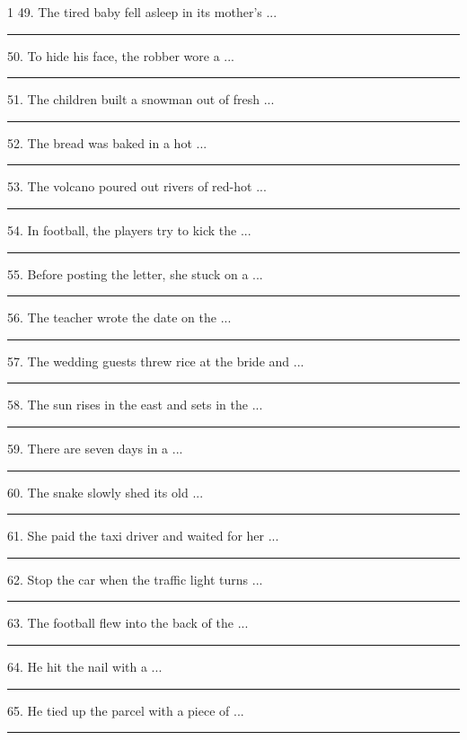 \documentclass[11pt,a4paper]{article}
\newcommand{\blank}[1][1.2cm]{\rule{#1}{0.4pt}}
\begin{document}
\begin{multicols}{1}
49. The tired baby fell asleep in its mother's ...\hfill\blank[3cm]\par\vspace{3pt}
50. To hide his face, the robber wore a ...\hfill\blank[3cm]\par\vspace{3pt}
51. The children built a snowman out of fresh ...\hfill\blank[3cm]\par\vspace{3pt}
52. The bread was baked in a hot ...\hfill\blank[3cm]\par\vspace{3pt}
53. The volcano poured out rivers of red-hot ...\hfill\blank[3cm]\par\vspace{3pt}
54. In football, the players try to kick the ...\hfill\blank[3cm]\par\vspace{3pt}
55. Before posting the letter, she stuck on a ...\hfill\blank[3cm]\par\vspace{3pt}
56. The teacher wrote the date on the ...\hfill\blank[3cm]\par\vspace{3pt}
57. The wedding guests threw rice at the bride and ...\hfill\blank[3cm]\par\vspace{3pt}
58. The sun rises in the east and sets in the ...\hfill\blank[3cm]\par\vspace{3pt}
59. There are seven days in a ...\hfill\blank[3cm]\par\vspace{3pt}
60. The snake slowly shed its old ...\hfill\blank[3cm]\par\vspace{3pt}
61. She paid the taxi driver and waited for her ...\hfill\blank[3cm]\par\vspace{3pt}
62. Stop the car when the traffic light turns ...\hfill\blank[3cm]\par\vspace{3pt}
63. The football flew into the back of the ...\hfill\blank[3cm]\par\vspace{3pt}
64. He hit the nail with a ...\hfill\blank[3cm]\par\vspace{3pt}
65. He tied up the parcel with a piece of ...\hfill\blank[3cm]\par\vspace{3pt}

\end{multicols}
\end{document}
